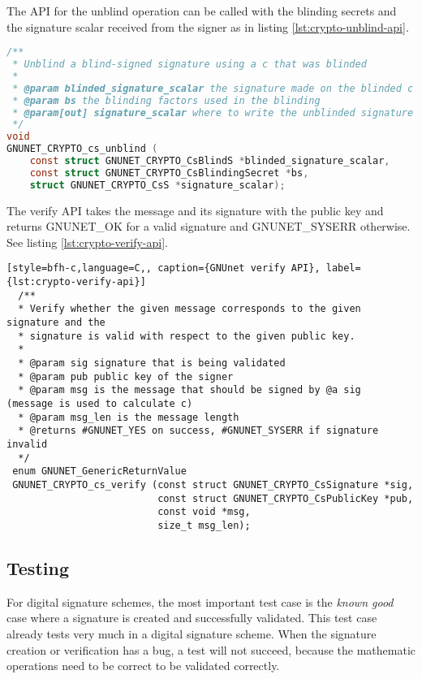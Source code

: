 The API for the unblind operation can be called with the blinding secrets and the signature scalar received from the signer as in listing \ref{lst:crypto-unblind-api}.

\begin{lstlisting}[style=bfh-c,language=C, caption={GNUnet unblind API}, label={lst:crypto-unblind-api}]
  /**
 * Unblind a blind-signed signature using a c that was blinded
 *
 * @param blinded_signature_scalar the signature made on the blinded c
 * @param bs the blinding factors used in the blinding
 * @param[out] signature_scalar where to write the unblinded signature
 */
void
GNUNET_CRYPTO_cs_unblind (
    const struct GNUNET_CRYPTO_CsBlindS *blinded_signature_scalar,
    const struct GNUNET_CRYPTO_CsBlindingSecret *bs,
    struct GNUNET_CRYPTO_CsS *signature_scalar);
\end{lstlisting}

The verify API takes the message and its signature with the public key and returns GNUNET\_OK for a valid signature and GNUNET\_SYSERR otherwise.
See listing \ref{lst:crypto-verify-api}.

\begin{lstlisting}[style=bfh-c,language=C,, caption={GNUnet verify API}, label={lst:crypto-verify-api}]
  /**
  * Verify whether the given message corresponds to the given signature and the
  * signature is valid with respect to the given public key.
  *
  * @param sig signature that is being validated
  * @param pub public key of the signer
  * @param msg is the message that should be signed by @a sig  (message is used to calculate c)
  * @param msg_len is the message length
  * @returns #GNUNET_YES on success, #GNUNET_SYSERR if signature invalid
  */
 enum GNUNET_GenericReturnValue
 GNUNET_CRYPTO_cs_verify (const struct GNUNET_CRYPTO_CsSignature *sig,
                          const struct GNUNET_CRYPTO_CsPublicKey *pub,
                          const void *msg,
                          size_t msg_len);
\end{lstlisting}

\subsection{Testing}
For digital signature schemes, the most important test case is the \textit{known good} case where a signature is created and successfully validated.
This test case already tests very much in a digital signature scheme.
When the signature creation or verification has a bug, a test will not succeed, because the mathematic operations need to be correct to be validated correctly.

